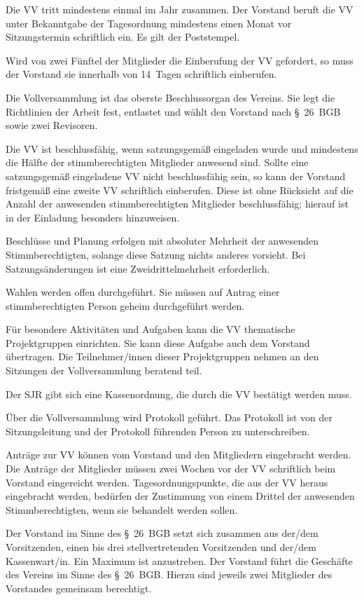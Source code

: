 \documentclass[10pt,a4paper,oneside,parskip=half]{scrartcl}
\begin{document}
\begin{contract}
Die VV tritt mindestens einmal im Jahr zusammen. Der Vorstand beruft die VV unter Bekanntgabe der Tagesordnung mindestens einen Monat vor Sitzungstermin schriftlich ein. Es gilt der Poststempel.

Wird von zwei Fünftel der Mitglieder die Einberufung der VV gefordert, so muss der Vorstand sie innerhalb von 14~Tagen schriftlich einberufen.

Die Vollversammlung ist das oberste Beschlussorgan des Vereins. Sie legt die Richtlinien der Arbeit fest, entlastet und wählt den Vorstand nach §~26~BGB sowie zwei Revisoren.

Die VV ist beschlussfähig, wenn satzungsgemäß eingeladen wurde und mindestens die Hälfte der stimmberechtigten Mitglieder anwesend sind. Sollte eine satzungsgemäß eingeladene VV nicht beschlussfähig sein, so kann der Vorstand fristgemäß eine zweite VV schriftlich einberufen. Diese ist ohne Rücksicht auf die Anzahl der anwesenden stimmberechtigten Mitglieder beschlussfähig; hierauf ist in der Einladung besonders hinzuweisen.

Beschlüsse und Planung erfolgen mit absoluter Mehrheit der anwesenden Stimmberechtigten, solange diese Satzung nichts anderes vorsieht. Bei Satzungsänderungen ist eine Zweidrittelmehrheit erforderlich.

Wahlen werden offen durchgeführt. Sie müssen auf Antrag einer stimmberechtigten Person geheim durchgeführt werden.

Für besondere Aktivitäten und Aufgaben kann die VV thematische Projektgruppen einrichten. Sie kann diese Aufgabe auch dem Vorstand übertragen. Die Teilnehmer/innen dieser Projektgruppen nehmen an den Sitzungen der Vollversammlung beratend teil.

Der SJR gibt sich eine Kassenordnung, die durch die VV bestätigt werden muss.

Über die Vollversammlung wird Protokoll geführt. Das Protokoll ist von der Sitzungsleitung und der Protokoll führenden Person zu unterschreiben.

Anträge zur VV können vom Vorstand und den Mitgliedern eingebracht werden. Die Anträge der Mitglieder müssen zwei Wochen vor der VV schriftlich beim Vorstand eingereicht werden. Tagesordnungspunkte, die aus der VV heraus eingebracht werden, bedürfen der Zustimmung von einem Drittel der anwesenden Stimmberechtigten, wenn sie behandelt werden sollen.

Der Vorstand im Sinne des §~26~BGB setzt sich zusammen aus der/dem Vorsitzenden, einen bis drei stellvertretenden Vorsitzenden und der/dem Kassenwart/in. Ein Maximum ist anzustreben. Der Vorstand führt die Geschäfte des Vereins im Sinne des §~26~BGB. Hierzu sind jeweils zwei Mitglieder des Vorstandes gemeinsam berechtigt.


\end{contract}
\end{document}
